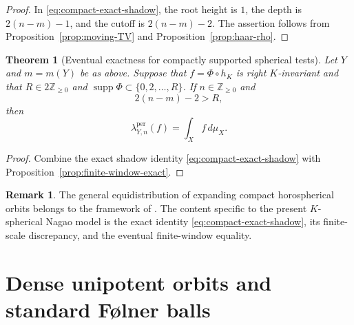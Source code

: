 \documentclass[11pt]{amsart}
\theoremstyle{definition}
\newtheorem{remark}[definition]{Remark}
\theoremstyle{plain}
\newtheorem{theorem}[definition]{Theorem}
\newcommand{\ZZ}{\mathbb Z}
\begin{document}
\begin{proof}
In \eqref{eq:compact-exact-shadow}, the root height is \(1\), the depth is
\(2(n-m)-1\), and the cutoff is \(2(n-m)-2\).  The assertion follows from
Proposition~\ref{prop:moving-TV} and Proposition~\ref{prop:haar-rho}.
\end{proof}

\begin{theorem}[Eventual exactness for compactly supported spherical tests]
\label{thm:compact-support-exact}
Let \(Y\) and \(m=m(Y)\) be as above.  Suppose that
\(f=\Phi\circ h_K\) is right \(K\)-invariant and that
\(R\in2\ZZ_{\ge0}\) and
\(\operatorname{supp}\Phi\subset\{0,2,\ldots,R\}\).  If
\(n\in\ZZ_{\ge0}\) and
\[
2(n-m)-2>R,
\]
then
\[
\lambda_{Y,n}^{\mathrm{per}}(f)=\int_Xf\,d\mu_X.
\]
\end{theorem}

\begin{proof}
Combine the exact shadow identity \eqref{eq:compact-exact-shadow} with
Proposition~\ref{prop:finite-window-exact}.
\end{proof}

\begin{remark}
The general equidistribution of expanding compact horospherical orbits belongs
to the framework of \cite{CFS2021}.  The content specific to the present
\(K\)-spherical Nagao model is the exact identity
\eqref{eq:compact-exact-shadow}, its finite-scale discrepancy, and the
eventual finite-window equality.
\end{remark}

\section{Dense unipotent orbits and standard F{\o}lner balls}
\label{sec:dense}
\end{document}
